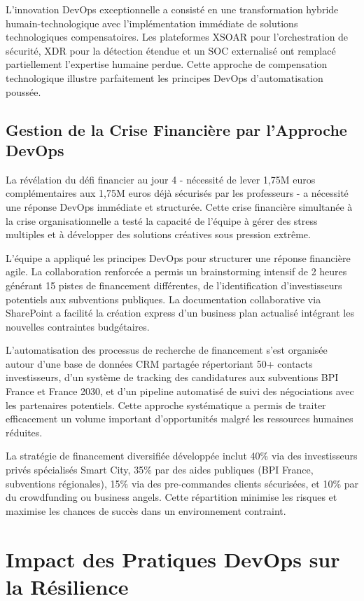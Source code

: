 \documentclass[12pt,a4paper]{article}
\begin{document}
L'innovation DevOps exceptionnelle a consisté en une transformation hybride humain-technologique avec l'implémentation immédiate de solutions technologiques compensatoires. Les plateformes XSOAR pour l'orchestration de sécurité, XDR pour la détection étendue et un SOC externalisé ont remplacé partiellement l'expertise humaine perdue. Cette approche de compensation technologique illustre parfaitement les principes DevOps d'automatisation poussée.

\subsection{Gestion de la Crise Financière par l'Approche DevOps}

La révélation du défi financier au jour 4 - nécessité de lever 1,75M euros complémentaires aux 1,75M euros déjà sécurisés par les professeurs - a nécessité une réponse DevOps immédiate et structurée. Cette crise financière simultanée à la crise organisationnelle a testé la capacité de l'équipe à gérer des stress multiples et à développer des solutions créatives sous pression extrême.

L'équipe a appliqué les principes DevOps pour structurer une réponse financière agile. La collaboration renforcée a permis un brainstorming intensif de 2 heures générant 15 pistes de financement différentes, de l'identification d'investisseurs potentiels aux subventions publiques. La documentation collaborative via SharePoint a facilité la création express d'un business plan actualisé intégrant les nouvelles contraintes budgétaires.

L'automatisation des processus de recherche de financement s'est organisée autour d'une base de données CRM partagée répertoriant 50+ contacts investisseurs, d'un système de tracking des candidatures aux subventions BPI France et France 2030, et d'un pipeline automatisé de suivi des négociations avec les partenaires potentiels. Cette approche systématique a permis de traiter efficacement un volume important d'opportunités malgré les ressources humaines réduites.

La stratégie de financement diversifiée développée inclut 40\% via des investisseurs privés spécialisés Smart City, 35\% par des aides publiques (BPI France, subventions régionales), 15\% via des pre-commandes clients sécurisées, et 10\% par du crowdfunding ou business angels. Cette répartition minimise les risques et maximise les chances de succès dans un environnement contraint.

\section{Impact des Pratiques DevOps sur la Résilience}
\end{document}
